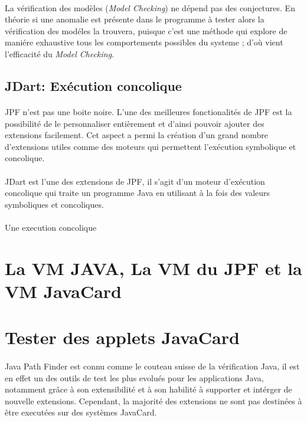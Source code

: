 			\paragraph{}
				La vérification des modèles (\textit{Model Checking}) ne dépend pas des conjectures. En théorie si une anomalie est présente dans le programme à tester
				alors la vérification des modéles la trouvera, puisque c'est une méthode qui explore de maniére exhaustive tous les comportements possibles du systeme ;
				d'où vient l'efficacité du \textit{Model Checking}.
		\subsection{JDart: Exécution concolique}
			\nocite{JDart}
			\nocite{JDart2}

			\paragraph{}
				\gls{JPF} n'est pas une boite noire. L'une des meilleures fonctionalités de \gls{JPF} est la possibilité de le personnaliser entièrement et d'ainsi pouvoir ajouter des extensions facilement.
				Cet aspect a permi la création d'un grand nombre d'extensions utiles comme des moteurs
				qui permettent l'exécution symbolique et concolique.

			\paragraph{}
				JDart est l'une des extensions de \gls{JPF}, il s'agit d'un moteur d'exécution concolique qui traite un programme Java
				en utilisant à la fois des valeurs symboliques et concoliques.

			\paragraph{}
				Une execution concolique
      
	\section{La VM JAVA, La VM du JPF et la VM JavaCard}
	\section{Tester des applets JavaCard}
	\paragraph{}
		Java Path Finder est connu comme le couteau suisse de la vérification Java,
		il est en effet un des outils de test les plus evolués pour les applications Java,
		notamment grâce à son extensibilité et à son habilité à supporter et intérger de nouvelle extensions.
		Cependant, la majorité des extensions ne sont pas destinées à être executées sur des systèmes JavaCard.